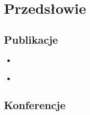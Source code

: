\chapter{Przedsłowie}

\section{Publikacje}
\begin{itemize}
  \item \cite{wieclaw20}
  \item \cite{stecko18}
\end{itemize}

\section{Konferencje}
